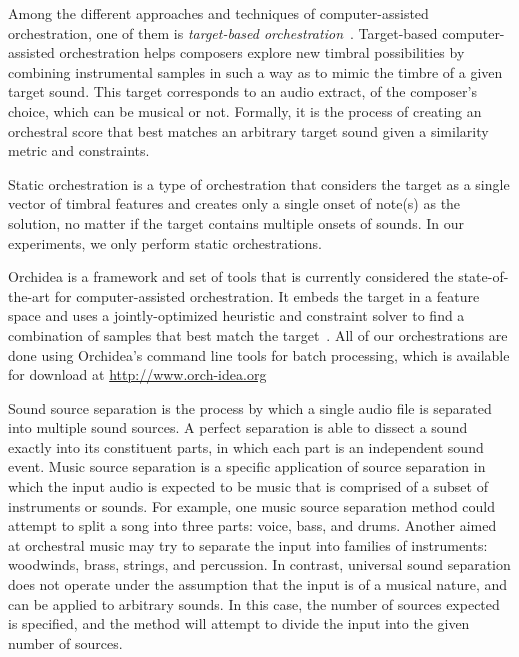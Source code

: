 \documentclass{article}
\begin{document}
	 Among the different approaches and techniques of computer-assisted orchestration, one of them is \textit{target-based orchestration}~\cite{Maresz2003}. Target-based computer-assisted orchestration helps composers explore new timbral possibilities by combining instrumental samples in such a way as to mimic the timbre of a given target sound. This target corresponds to an audio extract, of the composer's choice, which can be musical or not. Formally, it is the process of creating an orchestral score that best matches an arbitrary target sound given a similarity metric and constraints.

  Static orchestration is a type of orchestration that considers the target as a single vector of timbral features and creates only a single onset of note(s) as the solution, no matter if the target contains multiple onsets of sounds. In our experiments, we only perform static orchestrations.
  
  Orchidea is a framework and set of tools that is currently considered the state-of-the-art for computer-assisted orchestration. It embeds the target in a feature space and uses a jointly-optimized heuristic and constraint solver to find a combination of samples that best match the target~\cite{Cella18, Cella2020}. All of our orchestrations are done using Orchidea's command line tools for batch processing, which is available for download at \url{http://www.orch-idea.org}

  Sound source separation is the process by which a single audio file is separated into multiple sound sources. A perfect separation is able to dissect a sound exactly into its constituent parts, in which each part is an independent sound event. Music source separation is a specific application of source separation in which the input audio is expected to be music that is comprised of a subset of instruments or sounds. For example, one music source separation method could attempt to split a song into three parts: voice, bass, and drums. Another aimed at orchestral music may try to separate the input into families of instruments: woodwinds, brass, strings, and percussion. In contrast, universal sound separation does not operate under the assumption that the input is of a musical nature, and can be applied to arbitrary sounds. In this case, the number of sources expected is specified, and the method will attempt to divide the input into the given number of sources.    
  
\end{document}
